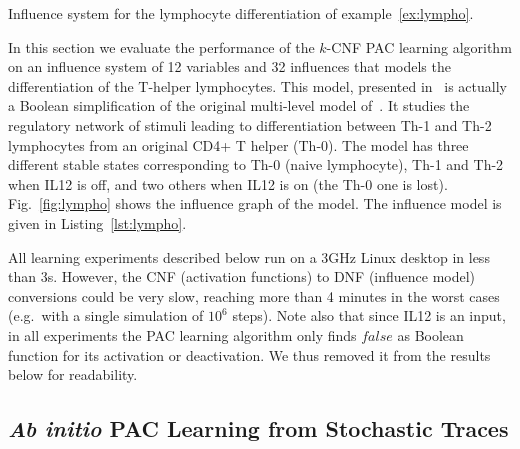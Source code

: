 \documentclass{llncs}
\begin{document}
\begin{listfig}[htb]
   
   \caption{Influence system for the lymphocyte differentiation of
   example~\ref{ex:lympho}.}\label{lst:lympho}
\end{listfig}

In this section we evaluate the performance of the $k$-CNF PAC learning
algorithm on an influence system of 12 variables and 32 influences that models
the differentiation of the T-helper lymphocytes.
This model, presented in~\cite{RRMTC06tcsb} is actually a Boolean
simplification of the original multi-level model
of~\cite{Mendoza06biosystems}. It studies the regulatory network of stimuli
leading to differentiation between Th-1 and Th-2 lymphocytes from an original
CD4+ T helper (Th-0).
The model has three different stable states corresponding to Th-0 (naive
lymphocyte), Th-1 and Th-2 when IL12 is off, and two others when IL12 is on
(the Th-0 one is lost).
Fig.~\ref{fig:lympho} shows the influence graph of the model. The
influence model is given in Listing~\ref{lst:lympho}.


All learning experiments described below run on a
3GHz Linux desktop in less than 3s.
However, the CNF (activation functions) to DNF (influence model) conversions could be very slow, reaching more than 4 minutes
in the worst cases (e.g.~with a single simulation of $10^6$ steps).
Note also that since IL12 is an input, in all experiments the PAC learning
algorithm only finds $false$ as Boolean function for its activation or
deactivation. We thus removed it from the results below for readability.


\subsection{\emph{Ab initio} PAC Learning from Stochastic Traces}
\label{sec:abinitio}
\end{document}
